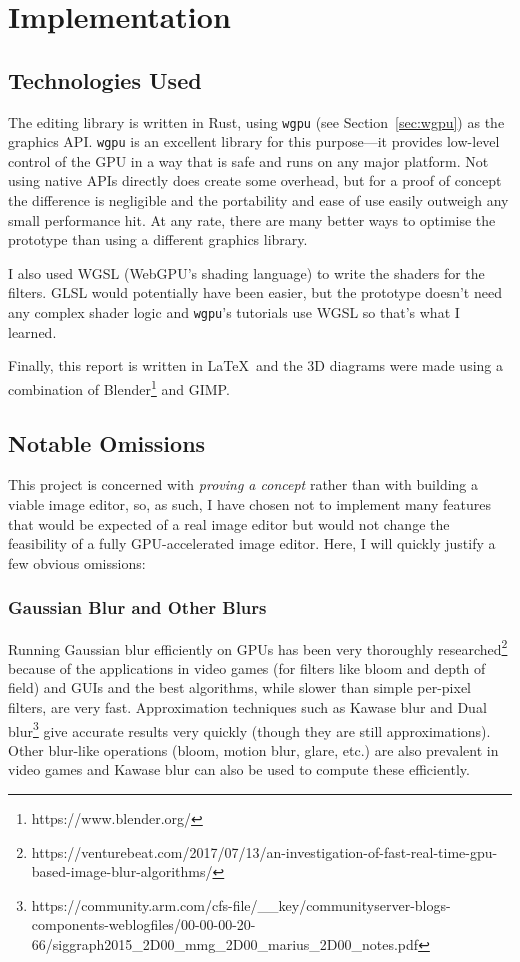 \documentclass[12pt]{article}
\begin{document}
\pagebreak

\section{Implementation}

\subsection{Technologies Used}

The editing library is written in Rust, using \verb|wgpu| (see Section~\ref{sec:wgpu}) as the
graphics API\@.  \verb|wgpu| is an excellent library for this purpose---it provides low-level
control of the GPU in a way that is safe and runs on any major platform.  Not using native APIs
directly does create some overhead, but for a proof of concept the difference is negligible and the
portability and ease of use easily outweigh any small performance hit.  At any rate, there are many
better ways to optimise the prototype than using a different graphics library.

I also used WGSL (WebGPU's shading language) to write the shaders for the filters.  GLSL would
potentially have been easier, but the prototype doesn't need any complex shader logic and
\verb|wgpu|'s tutorials use WGSL so that's what I learned.

Finally, this report is written in \LaTeX\ and the 3D diagrams were made using a combination of
Blender\footnote{https://www.blender.org/} and GIMP.

\subsection{Notable Omissions}

This project is concerned with \emph{proving a concept} rather than with building a viable image
editor, so, as such, I have chosen not to implement many features that would be expected of a real
image editor but would not change the feasibility of a fully GPU-accelerated image editor.  Here, I
will quickly justify a few obvious omissions:

\subsubsection{Gaussian Blur and Other Blurs}

Running Gaussian blur efficiently on GPUs has been very thoroughly
researched\footnote{https://venturebeat.com/2017/07/13/an-investigation-of-fast-real-time-gpu-based-image-blur-algorithms/}
because of the applications in video games (for filters like bloom and depth of field) and GUIs and
the best algorithms, while slower than simple per-pixel filters, are very fast.  Approximation
techniques such as Kawase blur and Dual
blur\footnote{https://community.arm.com/cfs-file/\_\_key/communityserver-blogs-components-weblogfiles/00-00-00-20-66/siggraph2015\_2D00\_mmg\_2D00\_marius\_2D00\_notes.pdf}
give accurate results very quickly (though they are still approximations).  Other blur-like
operations (bloom, motion blur, glare, etc.) are also prevalent in video games and Kawase blur can
also be used to compute these efficiently.
\end{document}
